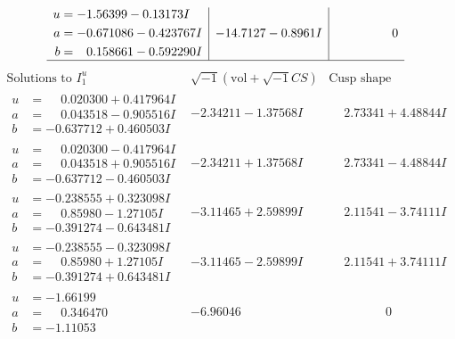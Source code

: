 \documentclass[1p]{elsarticle_modified}
\theoremstyle{definition}
\newcommand{\I}{\sqrt{-1}}
\begin{document}
$$\begin{array}{c|c|c}
\begin{aligned}
u &= -1.56399 - 0.13173 I \\
a &= -0.671086 - 0.423767 I \\
b &= \phantom{-}0.158661 - 0.592290 I\end{aligned}
 & -14.7127 - 0.8961 I & \phantom{-0.000000 } 0\\
 \hline 
 \end{array}$$\newpage$$\begin{array}{c|c|c}  
\text{Solutions to }I^u_{1}& \I (\text{vol} + \sqrt{-1}CS) & \text{Cusp shape}\\
 \hline 
\begin{aligned}
u &= \phantom{-}0.020300 + 0.417964 I \\
a &= \phantom{-}0.043518 - 0.905516 I \\
b &= -0.637712 + 0.460503 I\end{aligned}
 & -2.34211 - 1.37568 I & \phantom{-}2.73341 + 4.48844 I \\ \hline\begin{aligned}
u &= \phantom{-}0.020300 - 0.417964 I \\
a &= \phantom{-}0.043518 + 0.905516 I \\
b &= -0.637712 - 0.460503 I\end{aligned}
 & -2.34211 + 1.37568 I & \phantom{-}2.73341 - 4.48844 I \\ \hline\begin{aligned}
u &= -0.238555 + 0.323098 I \\
a &= \phantom{-}0.85980 - 1.27105 I \\
b &= -0.391274 - 0.643481 I\end{aligned}
 & -3.11465 + 2.59899 I & \phantom{-}2.11541 - 3.74111 I \\ \hline\begin{aligned}
u &= -0.238555 - 0.323098 I \\
a &= \phantom{-}0.85980 + 1.27105 I \\
b &= -0.391274 + 0.643481 I\end{aligned}
 & -3.11465 - 2.59899 I & \phantom{-}2.11541 + 3.74111 I \\ \hline\begin{aligned}
u &= -1.66199\phantom{ +0.000000I} \\
a &= \phantom{-}0.346470\phantom{ +0.000000I} \\
b &= -1.11053\phantom{ +0.000000I}\end{aligned}
 & -6.96046\phantom{ +0.000000I} & \phantom{-0.000000 } 0 \\ \hline\begin{aligned}

\end{aligned}
\end{array}$$
\end{document}
